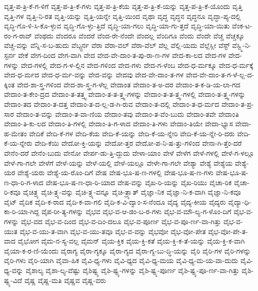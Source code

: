 {ವೃತ್ತ-ಪ-ತ್ರಿ-ಕೆ-ಗ-ಳಿಗೆ
ವೃತ್ತ-ಪ-ತ್ರಿ-ಕೆ-ಗಳು
ವೃತ್ತ-ಪ-ತ್ರಿ-ಕೆಯ
ವೃತ್ತ-ಪ-ತ್ರಿ-ಕೆ-ಯನ್ನು
ವೃತ್ತ-ಪ-ತ್ರಿ-ಕೆ-ಯೊಂದು
ವೃತ್ತಿ
ವೃತ್ತಿ-ಗಳ
ವೃತ್ತಿ-ನಿ-ರತ
ವೃತ್ತಿ-ಯನ್ನು
ವೃತ್ತಿ-ಯನ್ನೇ
ವೃತ್ತಿ-ಯಿಂದ
ವೃಥಾ
ವೃದ್ಧ
ವೃದ್ಧನ
ವೃದ್ಧನೂ
ವೃದ್ಧಾ-ಪ್ಯ-ದಲ್ಲಿ
ವೃದ್ಧಿ-ಗೊ-ಳಿ-ಸಿ-ಕೊ-ಳ್ಳುವ
ವೃದ್ಧಿ-ಗೊ-ಳ್ಳು-ತ್ತಿದೆ
ವೃದ್ಧಿ-ಯಾ-ಗಲು
ವೃದ್ಧಿ-ಯಾ-ಗು-ತ್ತದೆ
ವೃದ್ಧಿ-ಯಾ-ಯಿತು
ವೆಂಕ-ಟ-ರಂ-ಗ-ರಾವ್
ವೆಂಥದು
ವೆಂದರೂ
ವೆಂದರೆ
ವೆಂದ-ರೇ-ನೆಂದೇ
ವೆಂದಲ್ಲ
ವೆಂದಿಗೂ
ವೆಂದು
ವೆಂದೇ
ವೆಚ್ಚ
ವೆಚ್ಚಕ್ಕೂ
ವೆಚ್ಚ-ವನ್ನು
ವೆನ್ನಿ-ಸ-ಬ-ಹುದು
ವೆಬ್ಸ್ಟರ್ನ
ವೆರಾ
ವೆರಾ-ವಲ್
ವೆರಾ-ವೆಲ್
ವೆಲ್ಲ
ವೆಲ್ಲಿ-ಯದು
ವೆಲ್ಲೆಸ್ಲೀ
ವೆಸ್ಟ್
ವೆಸ್ಟ್ಮಿ-ನಿ-ಸ್ಟರ್ನ
ವೇಕೆ
ವೇಗ-ದಿಂದ
ವೇಗ-ವಾಗಿ
ವೇದ
ವೇದ-ವೇ-ದಾಂ-ತ-ಪು-ರಾ-ಣ-ಗಳ
ವೇದ-ಕಾ-ಲದ
ವೇದ-ಗಳ
ವೇದ-ಗಳನ್ನು
ವೇದ-ಗಳಲ್ಲಿ
ವೇದ-ಗ-ಳ-ಲ್ಲಿನ
ವೇದ-ಗಳಿಂದ
ವೇದ-ಗಳು
ವೇದ-ಗ-ಳೆಂಬ
ವೇದ-ಧ-ರ್ಮಕ್ಕೂ
ವೇದ-ಧ-ರ್ಮಕ್ಕೆ
ವೇದ-ಧ-ರ್ಮದ
ವೇದ-ಧ-ರ್ಮ-ವನ್ನು
ವೇದ-ವನ್ನು
ವೇದವು
ವೇದ-ವೇ-ದಾಂ-ತ-ಗಳ
ವೇದ-ವೇ-ದಾಂ-ತ-ಗ-ಳೆ-ಲ್ಲ-ದ-ಕ್ಕಿಂತ
ವೇದ-ಶಾ-ಸ್ತ್ರ-ಗಳಿಂದ
ವೇದ-ಶಾ-ಸ್ತ್ರ-ಗ-ಳೆಲ್ಲ
ವೇದಾಂತ
ವೇದಾಂ-ತ-ಅ-ದರ
ವೇದಾಂ-ತ-ಕ-ಡಿ-ಯ-ಲಾ-ಗದ
ವೇದಾಂ-ತ-ಕೇಂ-ದ್ರದ
ವೇದಾಂ-ತ-ತತ್ತ್ವ
ವೇದಾಂ-ತ-ತ-ತ್ತ್ವ-ಗಳನ್ನು
ವೇದಾಂ-ತ-ತ-ತ್ತ್ವ-ಗಳಲ್ಲಿ
ವೇದಾಂ-ತ-ತ್ತ್ವ-ಗಳನ್ನು
ವೇದಾಂ-ತದ
ವೇದಾಂ-ತ-ದತ್ತ
ವೇದಾಂ-ತ-ದ-ಲ್ಲ-ಡ-ಗಿ-ರುವ
ವೇದಾಂ-ತ-ದಲ್ಲಿ
ವೇದಾಂ-ತ-ಧ-ರ್ಮದ
ವೇದಾಂ-ತ-ಪ್ರ-ಸಾರ
ವೇದಾಂ-ತ-ವನ್ನು
ವೇದಾಂ-ತ-ವಾ-ಣಿಯ
ವೇದಾಂ-ತವು
ವೇದಾಂ-ತ-ವೆಂ-ಬುದು
ವೇದಾಂ-ತವೇ
ವೇದಾಂತಿ
ವೇದಾಂ-ತಿ-ಕು-ಲದ
ವೇದಾಂ-ತಿ-ಗಳಲ್ಲಿ
ವೇದಾಂ-ತಿ-ಗ-ಳಾದ
ವೇದಾಂ-ತಿ-ಗಳು
ವೇದಾಂ-ತಿಯೇ
ವೇದಾ-ಭ್ಯಾಸ
ವೇದಾ-ಹ-ಮೇತಂ
ವೇದಿಕೆ
ವೇದಿ-ಕೆ-ಗಳ
ವೇದಿ-ಕೆಯ
ವೇದಿ-ಕೆ-ಯನ್ನು
ವೇದಿ-ಕೆ-ಯ-ನ್ನೇರಿ
ವೇದಿ-ಕೆ-ಯ-ನ್ನೇ-ರಿ-ದರು
ವೇದಿ-ಕೆ-ಯ-ನ್ನೇರು
ವೇದಿ-ಕೆಯಿ
ವೇದೋ-ಕ್ತಿ-ಯನ್ನು
ವೇದೋ-ತ್ತರ
ವೇದೋ-ಪ-ನಿ-ಷ-ತ್ತು-ಗಳಿಂದ
ವೇನಾ-ಗಿ-ತ್ತೆಂ-ದರೆ
ವೇನೆಂ-ದರೆ
ವೇನೆಂ-ಬುದು
ವೇನೋ
ವೇರ್ಪ-ಡು-ತ್ತಿ-ದ್ದುದು
ವೇಳಾ-ಯಾಂ
ವೇಳೆ
ವೇಳೆಗ
ವೇಳೆ-ಗಳಲ್ಲಿ
ವೇಳೆ-ಗ-ಳಲ್ಲೂ
ವೇಳೆ-ಗಾ-ಗಲೇ
ವೇಳೆಗೆ
ವೇಳೆ-ಯನ್ನು
ವೇಳೆ-ಯಲ್ಲಿ
ವೇಳೆ-ಯಲ್ಲೂ
ವೇಳೇ-ಗಾ-ಗಲೇ
ವೇಶ್ಯಾ
ವೇಶ್ಯೆ
ವೇಶ್ಯೆಯ
ವೇಶ್ಯೆ-ಯರ
ವೇಶ್ಯೆ-ಯರು
ವೇಶ್ಯೆ-ಯ-ರೊಂ-ದಿಗೆ
ವೇಷ
ವೇಷ-ಭೂ-ಷ-ಣ-ಗಳಲ್ಲಿ
ವೇಷ-ಭೂ-ಷ-ಣ-ಗಳು
ವೇಷ-ಭೂ-ಷ-ಣ-ಧಾ-ರಿ-ಗ-ಳಾದ
ವೇಷ-ಭೂ-ಷ-ಣ-ಧಾ-ರಿ-ಯಾದ
ವೇಷ-ವನ್ನು
ವೈಖ-ರಿ-ಯನ್ನು
ವೈಖ-ರಿಯು
ವೈಚಾ-ರಿಕ
ವೈಚಾ-ರಿ-ಕವೂ
ವೈಚಿತ್ರ್ಯ
ವೈಚಿ-ತ್ರ್ಯ-ವನ್ನು
ವೈಚಿ-ತ್ರ್ಯ-ವನ್ನೂ
ವೈಚಿ-ತ್ರ್ಯಾತ್
ವೈಜ್ಞಾ-ನಿಕ
ವೈಜ್ಞಾ-ನಿ-ಕ-ವಾಗಿ
ವೈಜ್ಞಾ-ನಿ-ಕವೂ
ವೈಟ್
ವೈದಿಕ
ವೈದಿ-ಕ-ರಾದ
ವೈದಿ-ಕ-ವಾ-ಗಲಿ
ವೈದಿ-ಕ-ವಿ-ದ್ವಾಂ-ಸ-ನೆಂದೂ
ವೈದ್ಯ
ವೈದ್ಯ-ಕೀಯ
ವೈದ್ಯರು
ವೈದ್ಯಾ-ಧಿ-ಕಾ-ರಿ-ಯಾ-ಗಿದ್ದ
ವೈಪ-ರೀ-ತ್ಯ-ಗಳನ್ನು
ವೈಭವ
ವೈಭ-ವ-ಆ-ಡಂ-ಬ-ರ-ಗಳು
ವೈಭ-ವ-ಮೌ-ಲ್ಯ-ಗ-ಳೊಂ-ದಿಗೆ
ವೈಭ-ವ-ಗಳನ್ನು
ವೈಭ-ವದ
ವೈಭ-ವ-ದಿಂದ
ವೈಭ-ವ-ದಿಂ-ದಲೂ
ವೈಭ-ವ-ಪೂರ್ಣ
ವೈಭ-ವ-ಪೂ-ರ್ಣ-ವಾ-ಗಿತ್ತು
ವೈಭ-ವ-ಯುತ
ವೈಭ-ವ-ಯು-ತ-ವಾಗಿ
ವೈಭ-ವ-ಯು-ತವೂ
ವೈಭ-ವ-ವನ್ನು
ವೈಭವೋ
ವೈಭ-ವೋ-ಪೇತ
ವೈಭ-ವೋ-ಪೇ-ತ-ವಾದ
ವೈಭೋಗ
ವೈಮ-ನ-ಸ್ಯ-ವಲ್ಲ
ವೈಮನ್
ವೈಯ-ಕ್ತಿಕ
ವೈಯ-ಕ್ತಿ-ಕತೆ
ವೈಯ-ಕ್ತಿ-ಕ-ತೆ-ಯನ್ನು
ವೈಯ-ಕ್ತಿ-ಕ-ವಾಗಿ
ವೈಯಾ-ಕ-ರ-ಣಿ-ಯೆಂದು
ವೈರಾಗ್ಯ
ವೈರಾ-ಗ್ಯಕ್ಕೂ
ವೈರಾ-ಗ್ಯದ
ವೈರಾ-ಗ್ಯ-ಬು-ದ್ಧಿ-ಯನ್ನು
ವೈರಿ
ವೈರಿ-ಗಳ
ವೈರಿ-ಗಳನ್ನು
ವೈರಿ-ಗಳು
ವೈರಿ-ಯಾಗಿ
ವೈವಾ-ಹಿಕ
ವೈವಿ-ಧ್ಯ-ಗಳು
ವೈವಿ-ಧ್ಯದ
ವೈವಿ-ಧ್ಯ-ಮಯ
ವೈವಿ-ಧ್ಯ-ಮ-ಯ-ವಾ-ದುದು
ವೈವಿ-ಧ್ಯ-ವನ್ನು
ವೈಶಾಲ್ಯ
ವೈಶಾ-ಲ್ಯ-ವೆಷ್ಟು
ವೈಶಿಷ್ಟ್ಯ
ವೈಶಿ-ಷ್ಟ್ಯ-ಗಳನ್ನು
ವೈಶಿ-ಷ್ಟ್ಯ-ಪೂರ್ಣ
ವೈಶಿ-ಷ್ಟ್ಯ-ಪೂ-ರ್ಣ-ವಾ-ಗಿತ್ತು
ವೈಶಿ-ಷ್ಟ್ಯ-ವಿದೆ
ವೈಷ್ಣ
ವೈಷ್ಣ-ಮತಿ
ವೈಷ್ಣವ
ವೈಷ್ಣ-ವರು
}
